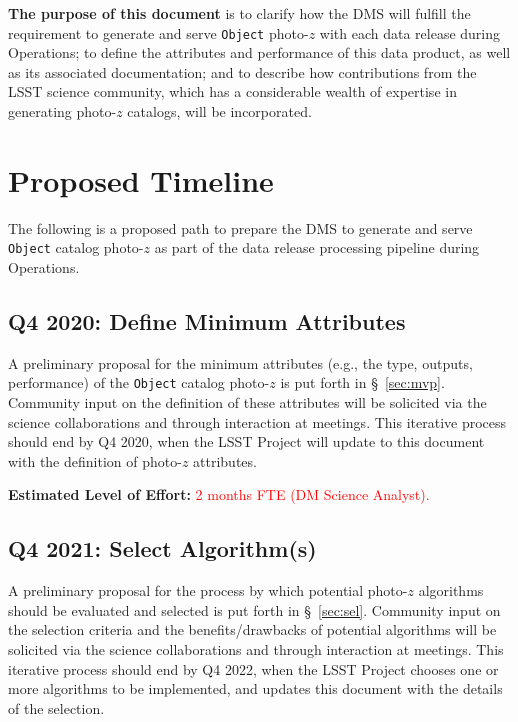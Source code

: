 \documentclass[DM,lsstdraft,toc]{lsstdoc}
\begin{document}
{\bf The purpose of this document} is to clarify how the DMS will fulfill the requirement to generate and serve {\tt Object} photo-$z$ with each data release during Operations; to define the attributes and performance of this data product, as well as its associated documentation; and to describe how contributions from the LSST science community, which has a considerable wealth of expertise in generating photo-$z$ catalogs, will be incorporated.


\clearpage
\section{Proposed Timeline}\label{sec:time}

The following is a proposed path to prepare the DMS to generate and serve {\tt Object} catalog photo-$z$ as part of the data release processing pipeline during Operations.

\subsection{Q4 2020: Define Minimum Attributes}\label{ssec:time_mvp}

A preliminary proposal for the minimum attributes (e.g., the type, outputs, performance) of the {\tt Object} catalog photo-$z$ is put forth in \S~\ref{sec:mvp}.
Community input on the definition of these attributes will be solicited via the science collaborations and through interaction at meetings.
This iterative process should end by Q4 2020, when the LSST Project will update to this document with the definition of photo-$z$ attributes. 

{\bf Estimated Level of Effort:} \textcolor{red}{2 months FTE (DM Science Analyst).}

\subsection{Q4 2021: Select Algorithm(s)}\label{ssec:time_sel}

A preliminary proposal for the process by which potential photo-$z$ algorithms should be evaluated and selected is put forth in \S~\ref{sec:sel}.
Community input on the selection criteria and the benefits/drawbacks of potential algorithms will be solicited via the science collaborations and through interaction at meetings.
This iterative process should end by Q4 2022, when the LSST Project chooses one or more algorithms to be implemented, and updates this document with the details of the selection.
\end{document}
